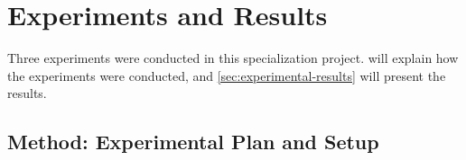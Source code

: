 \chapter{Experiments and Results}
\label{cha:experiments}

Three experiments were conducted in this specialization project.  will explain how the experiments were conducted, and \autoref{sec:experimental-results} will present the results.

\section{Method: Experimental Plan and Setup}
\label{sec:experimental-plan-and-setup}

